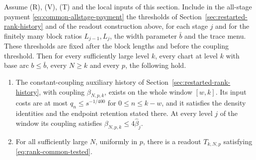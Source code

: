 \begin{proposition}
\label{prop:rank-trace-chart-window}
Assume (R), (V), (T) and the local inputs of this section. Include in the
all-stage payment \eqref{eq:common-allstage-payment} the thresholds of
Section~\ref{sec:restarted-rank-history} and of the readout construction
above, for each stage $j$ and for the finitely many block ratios
$L_{j-1},L_j$, the width parameter $\bar b$ and the trace menu. These
thresholds are fixed after the block lengths and before the coupling
threshold. Then for every sufficiently large level $k$, every chart at
level $k$ with base arc $b\le\bar b$, every $N\ge k$ and every $p$, the
following hold.
\begin{enumerate}
\item The constant-coupling auxiliary history of
 Section~\ref{sec:restarted-rank-history}, with coupling
 $\beta_{N,p,k}$, exists on the whole window $[w,k]$. Its input costs are
 at most $q_n\le s^{-1/400}$ for $0\le n\le k-w$, and it satisfies the
 density identities and the endpoint retention stated there. At every
 level $j$ of the window its coupling satisfies
 $\beta_{N,p,k}\le4\widehat\beta_j$.
\item For all sufficiently large $N$, uniformly in $p$, there is a readout
 $T_{k,N,p}$ satisfying \eqref{eq:rank-common-tested}.
\end{enumerate}
\end{proposition}
